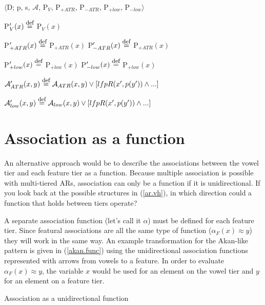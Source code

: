 \documentclass[,doc,floatsintext]{apa6}
\def\defeq{\mathrel{\buildrel \mbox{\footnotesize def} \over =}}
\theoremstyle{definition}
\theoremstyle{definition}
\theoremstyle{definition}
\theoremstyle{remark}
\begin{document}
\begin{exe}
\ex\label{qflfp.spread} $\langle$D; p, s, $\mathcal{A}$, P$_V$, P$_{+ATR}$, P$_{-ATR}$, P$_{+low}$, P$_{-low}\rangle$ 
\end{exe}

P\('_{V}(x) \defeq\) P\(_{V}(x)\)

P\('_{+ATR}(x) \defeq\) P\(_{+ATR}(x)\) \hspace{2.25in}
P\('_{-ATR}(x) \defeq\) P\(_{+ATR}(x)\)

P\('_{+low}(x) \defeq\) P\(_{+low}(x)\) \hspace{2.25in}
P\('_{-low}(x) \defeq\) P\(_{+low}(x)\)

\(\mathcal{A}_{ATR}'(x, y) \defeq \mathcal{A}_{ATR}(x, y)\vee [lfp R(x', p(y'))\wedge ...]\)

\(\mathcal{A}_{low}'(x, y) \defeq \mathcal{A}_{low}(x, y)\vee [lfp R(x', p(y'))\wedge ...]\)

\section{Association as a function}\label{association-as-a-function}

An alternative approach would be to describe the associations between
the vowel tier and each feature tier as a function. Because multiple
association is possible with multi-tiered ARs, association can only be a
function if it is unidirectional. If you look back at the possible
structures in (\ref{ar.vh}), in which direction could a function that
holds between tiers operate?

A separate association function (let's call it \(\alpha\)) must be
defined for each feature tier. Since featural associations are all the
same type of function (\(\alpha_F(x)\approx y\)) they will work in the
same way. An example transformation for the Akan-like pattern is given
in (\ref{akan.func}) using the unidirectional association functions
represented with arrows from vowels to a feature. In order to evaluate
\(\alpha_F(x)\approx y\), the variable \(x\) would be used for an
element on the vowel tier and \(y\) for an element on a feature tier.

\begin{exe}
\ex \label{akan.func} Association as a unidirectional function \\
\end{exe}
\end{document}
